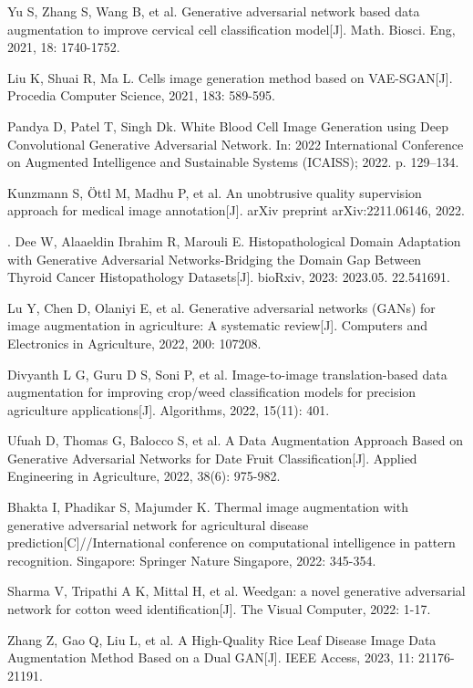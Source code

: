 \documentclass[preprint,12pt,authoryear]{elsarticle}
\begin{document}
\begin{thebibliography}{00}
 Yu S, Zhang S, Wang B, et al. Generative adversarial network based data augmentation to improve cervical cell classification model[J]. Math. Biosci. Eng, 2021, 18: 1740-1752.

 Liu K, Shuai R, Ma L. Cells image generation method based on VAE-SGAN[J]. Procedia Computer Science, 2021, 183: 589-595.

 Pandya D, Patel T, Singh Dk. White Blood Cell Image Generation using Deep Convolutional Generative Adversarial Network. In: 2022 International Conference on Augmented Intelligence and Sustainable Systems (ICAISS); 2022. p. 129–134.

 Kunzmann S, Öttl M, Madhu P, et al. An unobtrusive quality supervision approach for medical image annotation[J]. arXiv preprint arXiv:2211.06146, 2022.

. Dee W, Alaaeldin Ibrahim R, Marouli E. Histopathological Domain Adaptation with Generative Adversarial Networks-Bridging the Domain Gap Between Thyroid Cancer Histopathology Datasets[J]. bioRxiv, 2023: 2023.05. 22.541691.

 Lu Y, Chen D, Olaniyi E, et al. Generative adversarial networks (GANs) for image augmentation in agriculture: A systematic review[J]. Computers and Electronics in Agriculture, 2022, 200: 107208.

 Divyanth L G, Guru D S, Soni P, et al. Image-to-image translation-based data augmentation for improving crop/weed classification models for precision agriculture applications[J]. Algorithms, 2022, 15(11): 401.

 Ufuah D, Thomas G, Balocco S, et al. A Data Augmentation Approach Based on Generative Adversarial Networks for Date Fruit Classification[J]. Applied Engineering in Agriculture, 2022, 38(6): 975-982.

 Bhakta I, Phadikar S, Majumder K. Thermal image augmentation with generative adversarial network for agricultural disease prediction[C]//International conference on computational intelligence in pattern recognition. Singapore: Springer Nature Singapore, 2022: 345-354.

 Sharma V, Tripathi A K, Mittal H, et al. Weedgan: a novel generative adversarial network for cotton weed identification[J]. The Visual Computer, 2022: 1-17.

 Zhang Z, Gao Q, Liu L, et al. A High-Quality Rice Leaf Disease Image Data Augmentation Method Based on a Dual GAN[J]. IEEE Access, 2023, 11: 21176-21191.


\end{thebibliography}
\end{document}

